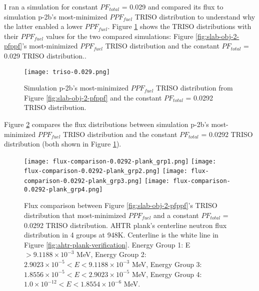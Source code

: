 I ran a simulation for constant $PF_{total}$ = 0.029 and compared its 
flux to simulation p-2b's most-minimized $PPF_{fuel}$ TRISO distribution to understand 
why the latter enabled a lower $PPF_{fuel}$. 
Figure \ref{fig:triso-0.0292} shows the TRISO distributions with 
their $PPF_{fuel}$ values for the two compared 
simulations: Figure \ref{fig:slab-obj-2-pfppf}'s most-minimized $PPF_{fuel}$
TRISO distribution and the constant $PF_{total}$ = 0.029 TRISO distribution.. 
\begin{figure}[htbp!]
    \centering
    \texttt{[image: triso-0.029.png]} 
    \caption{Simulation p-2b's most-minimized $PPF_{fuel}$ TRISO distribution 
    from Figure \ref{fig:slab-obj-2-pfppf} and the constant $PF_{total}$ = 0.0292
    TRISO distribution.}
    \label{fig:triso-0.0292}
\end{figure}

Figure \ref{fig:flux-comparison-0.0292-plank} compares the flux distributions between 
simulation p-2b's most-minimized $PPF_{fuel}$ TRISO distribution and the
constant $PF_{total}$ = 0.0292 TRISO distribution (both shown in Figure 
\ref{fig:triso-0.0292}).
\begin{figure}[htbp!]
    \centering
    \texttt{[image: flux-comparison-0.0292-plank\_grp1.png]} 
    \texttt{[image: flux-comparison-0.0292-plank\_grp2.png]} 
    \texttt{[image: flux-comparison-0.0292-plank\_grp3.png]} 
    \texttt{[image: flux-comparison-0.0292-plank\_grp4.png]} 
    \caption{Flux comparison between Figure \ref{fig:slab-obj-2-pfppf}'s TRISO 
    distribution that most-minimized $PPF_{fuel}$ and a constant $PF_{total}$ = 0.0292 
    TRISO distribution. 
    \acrfull{AHTR} plank's centerline neutron flux distribution in 4 groups at 948K. 
    Centerline is the white line in Figure \ref{fig:ahtr-plank-verification}.
    Energy Group 1: E $> 9.1188 \times 10^{-3}$ MeV, 
    Energy Group 2: $2.9023 \times 10^{-5} < E < 9.1188 \times 10^{-3}$ MeV,
    Energy Group 3:  $1.8556 \times 10^{-5} < E < 2.9023 \times 10^{-5}$ MeV,
    Energy Group 4:  $1.0 \times 10^{-12} < E < 1.8554 \times 10^{-6}$ MeV.}
    \label{fig:flux-comparison-0.0292-plank}
\end{figure}

